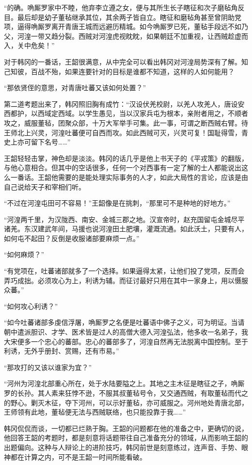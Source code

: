 “的确。唃厮罗家中不睦，他弃李立遵之女，便与其所生长子瞎征和次子磨毡角反目。最后却是幼子董毡继承其位，其余两子皆自立。瞎征和磨毡角甚至曾阴助党项，逼得唃厮罗离开青唐王城而远避历精城。如今唃厮罗已死，董毡手段远不如乃父，河湟一带又趋分裂。西贼对河湟虎视眈眈，如果朝廷不加重视，让西贼趁虚而入，关中危矣！”

对于韩冈的一番话，王韶很满意，从中完全可以看出韩冈对河湟局势深有了解。知己知彼，百战不殆，如果连要针对的目标是谁都不知道，这样的人如何能用？

“那依贤侄的意思，对青唐吐蕃又该如何处置？”

第二道考题出来了，韩冈照旧胸有成竹：“汉设伏羌校尉，以羌人攻羌人，唐设安西都护，以西域定西域。以学生愚见，当以汉家兵屯为根本，亲附者用之，不顺者攻之，威服董毡，团聚众部，十万大军举手可集。此一事，可谓之断西贼右臂。待王师北上兴灵，河湟吐蕃便可自西而攻。如此西贼可灭，兴灵可复！国耻得雪，青史上亦可留下名号……”

王韶轻轻击掌，神色却是淡淡。韩冈的话几乎是他上书天子的《平戎策》的翻版，与他心意相合。但其中的空话很多，任何一个对西事有一定了解的士人都能说出这么一番话。王韶他需要的是能处理实际事务的人才，如此大局性的言论，应该是由自己说给天子和宰相们听。

“不过在河湟屯田可不容易！”王韶像是在挑刺，“那里可不是种地的好地方。”

“河湟两千里，为汉陇西、南安、金城三郡之地。汉宣帝时，赵充国留屯金城尽平诸羌。东汉建武年间，马援也说河湟田土肥壤，灌溉流通。如此沃土，只要有人，如何屯不起田？反倒是收服诸部要麻烦一点。”

“如何麻烦？”

“有党项在，吐蕃诸部就多了一个选择。如果逼得太紧，让他们投了党项，反而会弄巧成拙。必须攻心为上，利诱为辅。而征讨最好只用在其中一家身上，用以慑服众蕃。”

“如何攻心利诱？”

“如今吐蕃诸部多虔信浮屠，唃厮罗之名便是吐蕃语中佛子之义，可为明证。当请朝中遣派胆识、才学、医术皆是过人的高僧大德入河湟弘法，他多收一名弟子，我大宋便多一个忠心的蕃部。忠心的蕃部多了，河湟自然再无法脱离中国控制。至于利诱，无外乎册封、赏赐，还有市易。”

“那攻打的又该以谁家为宜？”

“河州为河湟北部重心所在，处于水陆要隘之上。其地之主木征是瞎征之子，唃厮罗的长孙。其人素来狂悖不逊，不服其叔董毡号令，又交通西贼，有取董毡而代之的野心。剿灭木征，夺下河州，可以示好董毡，亦可威服之。河州地处青唐北部，王师领有此地，董毡便无法与西贼联络，也只能投靠于我……”

韩冈侃侃而谈，一切都已烂熟于胸。王韶的问题都在他的准备之中，更确切的说，他回答王韶的考题时，都是刻意将话题带往自己准备充分的领域，从而影响王韶的出题偏向。这种与人辩论上的进阶技巧，韩冈前世是刻意练过，连声音、手势、眼神都在计算之内，可不是王韶一时间所能看破。

